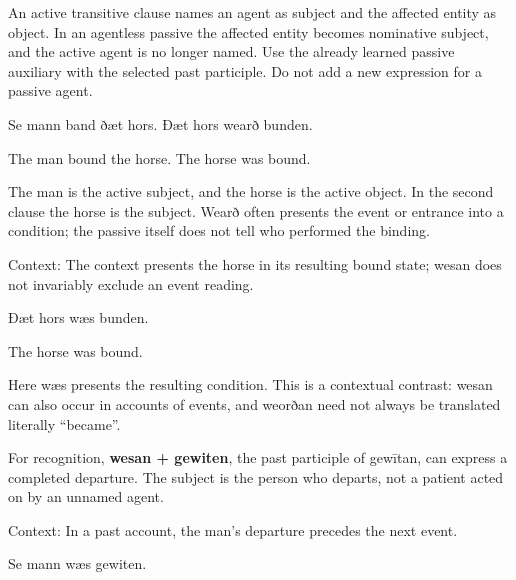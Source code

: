 An active transitive clause names an agent as subject and the affected entity as object. In an agentless passive the affected entity becomes nominative subject, and the active agent is no longer named. Use the already learned passive auxiliary with the selected past participle. Do not add a new expression for a passive agent.

Se mann band ðæt hors. Ðæt hors wearð bunden.

The man bound the horse. The horse was bound.

The man is the active subject, and the horse is the active object. In the second clause the horse is the subject. Wearð often presents the event or entrance into a condition; the passive itself does not tell who performed the binding.

Context: The context presents the horse in its resulting bound state; wesan does not invariably exclude an event reading.

Ðæt hors wæs bunden.

The horse was bound.

Here wæs presents the resulting condition. This is a contextual contrast: wesan can also occur in accounts of events, and weorðan need not always be translated literally “became”.

For recognition, \textbf{wesan + gewiten}, the past participle of gewītan, can express a completed departure. The subject is the person who departs, not a patient acted on by an unnamed agent.

Context: In a past account, the man’s departure precedes the next event.

Se mann wæs gewiten.

